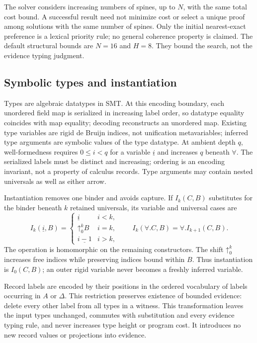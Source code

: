 \documentclass[10pt,a4paper]{article}
\begin{document}
The solver considers increasing numbers of spines, up to $N$, with the same total
cost bound. A successful result need not minimize cost or select a unique proof
among solutions with the same number of spines. Only the initial nearest-exact
preference is a lexical priority rule; no general coherence property is claimed.
The default structural bounds are $N=16$ and $H=8$.
They bound the search, not the evidence typing judgment.

\subsection{Symbolic types and instantiation}
\label{sec:symbolic-types}
Types are algebraic datatypes in SMT. At this encoding boundary,
each unordered field map is serialized in increasing label order, so datatype equality
coincides with map equality; decoding reconstructs an unordered map. Existing type variables
are rigid de Bruijn indices, not unification metavariables; inferred type arguments are
symbolic values of the type datatype.
At ambient depth $q$, well-formedness requires $0\le i<q$ for a variable
$\underline i$ and increases $q$ beneath $\forall$. The serialized labels must be distinct
and increasing; ordering is an encoding invariant, not a property of calculus records.
Type arguments may contain nested universals as well as either arrow.

Instantiation removes one binder and avoids capture. If $I_k(C,B)$ substitutes
for the binder beneath $k$ retained universals, its variable and universal cases are
\[
I_k(\underline i,B)=
\begin{cases}
 \underline i&i<k,\\
 \mathord{\uparrow}^{k}_{0}B&i=k,\\
 \underline{i-1}&i>k,
\end{cases}
\qquad
I_k(\forall.C,B)=\forall.I_{k+1}(C,B).
\]
The operation is homomorphic on the remaining constructors. The shift
$\mathord{\uparrow}^{k}_{0}$ increases free indices while preserving indices bound
within $B$. Thus instantiation is $I_0(C,B)$; an outer rigid variable never becomes
a freshly inferred variable.

Record labels are encoded by their positions in the ordered vocabulary of labels
occurring in $A$ or $\Delta$. This restriction preserves existence of bounded
evidence: delete every other label from all types in a witness. This transformation
leaves the input types unchanged, commutes with substitution and every evidence
typing rule, and never increases type height or program cost. It introduces no
new record values or projections into evidence.
\end{document}
